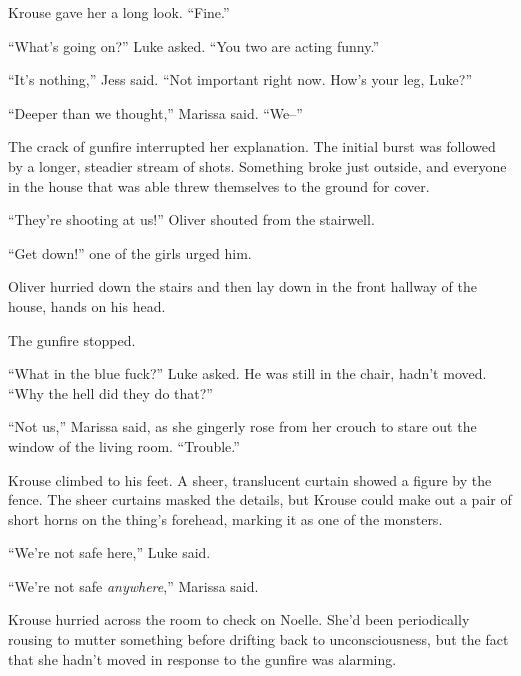 Krouse gave her a long look.  ``Fine.''



``What's going on?'' Luke asked.  ``You two are acting funny.''



``It's nothing,'' Jess said.  ``Not important right now.  How's your leg, Luke?''



``Deeper than we thought,'' Marissa said.  ``We--''



The crack of gunfire interrupted her explanation.  The initial burst was followed by a longer, steadier stream of shots.  Something broke just outside, and everyone in the house that was able threw themselves to the ground for cover.



``They're shooting at us!'' Oliver shouted from the stairwell.



``Get down!'' one of the girls urged him.



Oliver hurried down the stairs and then lay down in the front hallway of the house, hands on his head.



The gunfire stopped.



``What in the blue fuck?'' Luke asked.  He was still in the chair, hadn't moved.  ``Why the hell did they do that?''



``Not us,'' Marissa said, as she gingerly rose from her crouch to stare out the window of the living room.  ``Trouble.''



Krouse climbed to his feet.  A sheer, translucent curtain showed a figure by the fence.  The sheer curtains masked the details, but Krouse could make out a pair of short horns on the thing's forehead, marking it as one of the monsters.



``We're not safe here,'' Luke said.



``We're not safe \emph{anywhere},'' Marissa said.



Krouse hurried across the room to check on Noelle.  She'd been periodically rousing to mutter something before drifting back to unconsciousness, but the fact that she hadn't moved in response to the gunfire was alarming.



